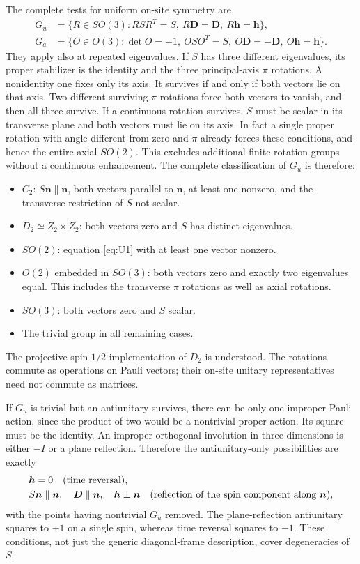 \documentclass[11pt]{article}
\newcommand{\nn}{\boldsymbol n}
\newcommand{\DD}{\boldsymbol D}
\newcommand{\hh}{\boldsymbol h}
\begin{document}
The complete tests for uniform on-site symmetry are
\begin{align}
 G_u&=\{R\in SO(3):RSR^T=S,\ R\DD=\DD,\ R\hh=\hh\},\label{eq:Gu}\\
 G_a&=\{O\in O(3):\det O=-1,\ OSO^T=S,\ O\DD=-\DD,\ O\hh=\hh\}.
 \label{eq:Ga}
\end{align}
They apply also at repeated eigenvalues. If $S$ has three different
eigenvalues, its proper stabilizer is the identity and the three principal-axis
$\pi$ rotations. A nonidentity one fixes only its axis. It survives if and
only if both vectors lie on that axis. Two different surviving $\pi$ rotations
force both vectors to vanish, and then all three survive. If a continuous
rotation survives, $S$ must be scalar in its transverse plane and both vectors
must lie on its axis. In fact a single proper rotation with angle different
from zero and $\pi$ already forces these conditions, and hence the entire
axial $SO(2)$. This excludes additional finite rotation groups without a
continuous enhancement. The complete classification of $G_u$ is therefore:
\begin{itemize}
\item $C_2$: $S\nn\parallel\nn$, both vectors parallel to $\nn$, at least one
  nonzero, and the transverse restriction of $S$ not scalar.
\item $D_2\simeq Z_2\times Z_2$: both vectors zero and $S$ has distinct eigenvalues.
\item $SO(2)$: equation \eqref{eq:U1} with at least one vector nonzero.
\item $O(2)$ embedded in $SO(3)$: both vectors zero and exactly two eigenvalues
  equal. This includes the transverse $\pi$ rotations as well as axial rotations.
\item $SO(3)$: both vectors zero and $S$ scalar.
\item The trivial group in all remaining cases.
\end{itemize}
The projective spin-$1/2$ implementation of $D_2$ is understood. The rotations
commute as operations on Pauli vectors; their on-site unitary representatives
need not commute as matrices.

If $G_u$ is trivial but an antiunitary survives, there can be only one
improper Pauli action, since the product of two would be a nontrivial proper
action. Its square must be the identity. An improper orthogonal involution
in three dimensions is either $-I$ or a plane reflection. Therefore the
antiunitary-only possibilities are exactly
\begin{align}
 &\hh=0\quad\hbox{(time reversal)},\label{eq:Tclass}\\
 &S\nn\parallel\nn,\quad \DD\parallel\nn,\quad \hh\perp\nn
 \quad\hbox{(reflection of the spin component along }\nn\hbox{)},
 \label{eq:Kclass}
\end{align}
with the points having nontrivial $G_u$ removed. The plane-reflection
antiunitary squares to $+1$ on a single spin, whereas time reversal squares to
$-1$. These conditions, not just the generic diagonal-frame description,
cover degeneracies of $S$.
\end{document}
